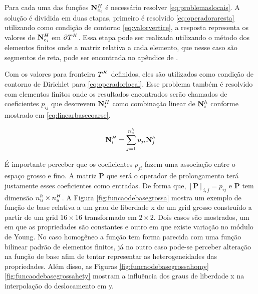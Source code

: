 Para cada uma das funções $\basefunctionelemcoarse$ é necessário resolver \eqref{eq:problemaslocais}. A solução é dividida em duas etapas, primeiro é resolvido \eqref{eq:operadoraresta} utilizando como condição de contorno \eqref{eq:valorvertice}, a resposta representa os valores de $\basefunctionelemcoarse$ em $\partial\coarseelement$. Essa etapa pode ser realizada utilizando o  método dos elementos finitos onde a matriz relativa a cada elemento, que nesse caso são segmentos de reta, pode ser encontrada no apêndice de \cite{casteletto}. 


Com os valores para  fronteira $\coarseelement$  definidos, eles são utilizados como condição de contorno de Dirichlet para \eqref{eq:operadorlocal}. Esse problema também é resolvido com elementos finitos onde os resultados encontrados serão chamados de coeficientes $p_{ij}$ que descrevem $\basefunctioncoarse$ como combinação linear de $\basefunctionfine$ conforme mostrado em \eqref{eq:linearbasecoarse}. 


\begin{equation} \label{eq:linearbasecoarse}
    \basefunctioncoarse = \sum_{j=1}^{\qtdfreedomfine} p_{ji} \basefunctionfine[j]
\end{equation}


É importante perceber que os coeficientes $p_{ji}$ fazem uma associação entre o espaço grosso e fino. A matriz $\mathbf{P}$ que será o operador de prolongamento terá justamente esses coeficientes como entradas. De forma que, $[\mathbf{P}]_{i,j} = p_{ij}$ e $\mathbf{P}$ tem dimensão $\qtdfreedomfine \times \qtdfreedomcoarse$. A Figura \ref{fig:funcaodebasegrossa} mostra um exemplo de função de base relativa a um grau de liberdade x de um grid grosso construído a partir de um grid $16\times16$ transformado em  $2\times2$. Dois casos são mostrados, um em que as propriedades são constantes e outro em que existe variação no módulo de Young. No caso homogêneo a função tem forma parecida com uma função bilinear padrão de elementos finitos, já no outro caso pode-se perceber alteração na função de base afim de tentar representar as heterogeneidades das propriedades. Além disso, as Figuras \ref{fig:funcaodebasegrossahomy} \ref{fig:funcaodebasegrossahety} mostram a influência dos graus de liberdade x na interpolação do deslocamento em y.



